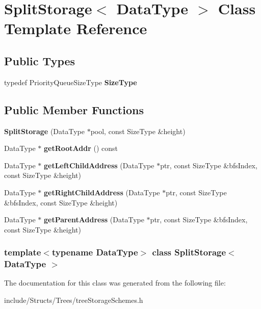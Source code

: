 \hypertarget{class_split_storage}{
\section{SplitStorage$<$ DataType $>$ Class Template Reference}
\label{class_split_storage}
}
\subsection*{Public Types}
\begin{DoxyCompactItemize}
\item 
\hypertarget{class_split_storage_a5378262dcf276f1223ffbde3f0e109a6}{
typedef PriorityQueueSizeType {\bfseries SizeType}}
\label{class_split_storage_a5378262dcf276f1223ffbde3f0e109a6}

\end{DoxyCompactItemize}
\subsection*{Public Member Functions}
\begin{DoxyCompactItemize}
\item 
\hypertarget{class_split_storage_aac4028c0af558bc4da8635560545701a}{
{\bfseries SplitStorage} (DataType $\ast$pool, const SizeType \&height)}
\label{class_split_storage_aac4028c0af558bc4da8635560545701a}

\item 
\hypertarget{class_split_storage_a28bb572a1f4c4235250d5d4fe2169e2c}{
DataType $\ast$ {\bfseries getRootAddr} () const }
\label{class_split_storage_a28bb572a1f4c4235250d5d4fe2169e2c}

\item 
\hypertarget{class_split_storage_a8c567039404475fe6bbe33099593bcb6}{
DataType $\ast$ {\bfseries getLeftChildAddress} (DataType $\ast$ptr, const SizeType \&bfsIndex, const SizeType \&height)}
\label{class_split_storage_a8c567039404475fe6bbe33099593bcb6}

\item 
\hypertarget{class_split_storage_a6eaefe4a44f503caeeaa0d425a11a4e1}{
DataType $\ast$ {\bfseries getRightChildAddress} (DataType $\ast$ptr, const SizeType \&bfsIndex, const SizeType \&height)}
\label{class_split_storage_a6eaefe4a44f503caeeaa0d425a11a4e1}

\item 
\hypertarget{class_split_storage_a8d5e10a0a4de8b783b2eaa336f22b644}{
DataType $\ast$ {\bfseries getParentAddress} (DataType $\ast$ptr, const SizeType \&bfsIndex, const SizeType \&height)}
\label{class_split_storage_a8d5e10a0a4de8b783b2eaa336f22b644}

\end{DoxyCompactItemize}
\subsubsection*{template$<$typename DataType$>$ class SplitStorage$<$ DataType $>$}



The documentation for this class was generated from the following file:\begin{DoxyCompactItemize}
\item 
include/Structs/Trees/treeStorageSchemes.h\end{DoxyCompactItemize}
